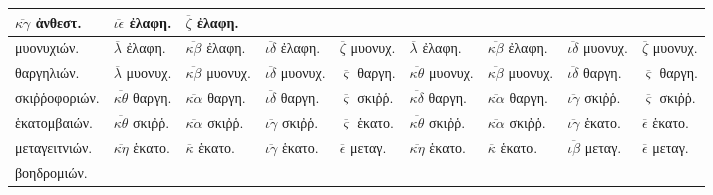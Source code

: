 \begin{tabular}{@{}l llllllll@{}}
$\overline{\kappa\gamma}$    \textgreek{ἀνθεστ.} &
$\overline{\iota\epsilon}$   \textgreek{ἐλαφη.} &
$\overline{\zeta}$           \textgreek{ἐλαφη.}
\\
\hline
\textgreek{μυονυχιών.} &
$\overline{\lambda}$         \textgreek{ἐλαφη.} &
$\overline{\kappa\beta}$     \textgreek{ἐλαφη.} &
$\overline{\iota\delta}$     \textgreek{ἐλαφη.} &
$\overline{\zeta}$           \textgreek{μυονυχ.} &
$\overline{\lambda}$         \textgreek{ἐλαφη.} &
$\overline{\kappa\beta}$     \textgreek{ἐλαφη.} &
$\overline{\iota\delta}$     \textgreek{μυονυχ.} &
$\overline{\zeta}$           \textgreek{μυονυχ.}
\\
\textgreek{θαργηλιών.} &
$\overline{\lambda}$         \textgreek{μυονυχ.} &
$\overline{\kappa\beta}$     \textgreek{μυονυχ.} &
$\overline{\iota\delta}$     \textgreek{μυονυχ.} &
$\overline{\varsigma}$       \textgreek{θαργη.} &
$\overline{\kappa\theta}$    \textgreek{μυονυχ.} &
$\overline{\kappa\beta}$     \textgreek{μυονυχ.} &
$\overline{\iota\delta}$     \textgreek{θαργη.} &
$\overline{\varsigma}$       \textgreek{θαργη.}
\\
\textgreek{σκιῤῥοφοριών.} &
$\overline{\kappa\theta}$    \textgreek{θαργη.} &
$\overline{\kappa\alpha}$    \textgreek{θαργη.} &
$\overline{\iota\delta}$     \textgreek{θαργη.} &
$\overline{\varsigma}$       \textgreek{σκιῤῥ.} &
$\overline{\kappa\delta}$    \textgreek{θαργη.} &
$\overline{\kappa\alpha}$    \textgreek{θαργη.} &
$\overline{\iota\gamma}$     \textgreek{σκιῤῥ.} &
$\overline{\varsigma}$       \textgreek{σκιῤῥ.}
\\
\hline
\textgreek{ἑκατομβαιών.} &
$\overline{\kappa\theta}$    \textgreek{σκιῤῥ.} &
$\overline{\kappa\alpha}$    \textgreek{σκιῤῥ.} &
$\overline{\iota\gamma}$     \textgreek{σκιῤῥ.} &
$\overline{\varsigma}$       \textgreek{ἑκατο.} &
$\overline{\kappa\theta}$    \textgreek{σκιῤῥ.} &
$\overline{\kappa\alpha}$    \textgreek{σκιῤῥ.} &
$\overline{\iota\gamma}$     \textgreek{ἑκατο.} &
$\overline{\epsilon}$        \textgreek{ἑκατο.}
\\
\textgreek{μεταγειτνιών.} &
$\overline{\kappa\eta}$      \textgreek{ἑκατο.} &
$\overline{\kappa}$          \textgreek{ἑκατο.} &
$\overline{\iota\gamma}$     \textgreek{ἑκατο.} &
$\overline{\epsilon}$        \textgreek{μεταγ.} &
$\overline{\kappa\eta}$      \textgreek{ἑκατο.} &
$\overline{\kappa}$          \textgreek{ἑκατο.} &
$\overline{\iota\beta}$      \textgreek{μεταγ.} &
$\overline{\epsilon}$        \textgreek{μεταγ.}
\\
\textgreek{βοηδρομιών.} &

\end{tabular}
